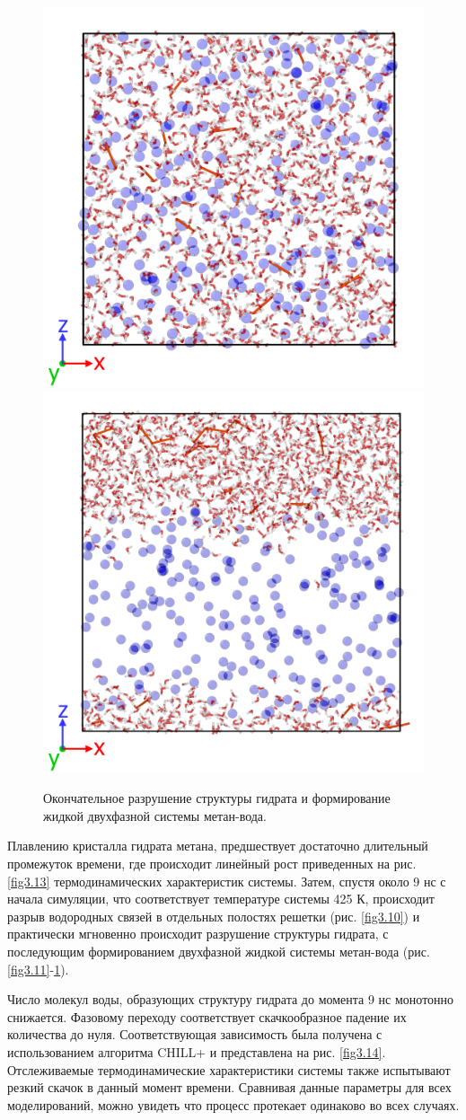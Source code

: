 \begin{figure}[H]
    \centering
    \begin{minipage}{\linewidth}
        \includegraphics[width=.5\linewidth]{figures/tip4p_melt7.png}\hfill
        \includegraphics[width=.5\linewidth]{figures/tip4p_melt8.png}
    \end{minipage}
    \caption{Окончательное разрушение структуры гидрата и формирование жидкой двухфазной системы метан-вода.}
    \label{fig3.12}
\end{figure}

Плавлению кристалла гидрата метана, предшествует достаточно длительный промежуток времени, где происходит линейный рост приведенных на рис. \ref{fig3.13} термодинамических характеристик системы. Затем, спустя около 9 нс с начала симуляции, что соответствует температуре системы 425 К, происходит разрыв водородных связей в отдельных полостях решетки (рис. \ref{fig3.10}) и практически мгновенно происходит разрушение структуры гидрата, с последующим формированием двухфазной жидкой системы метан-вода (рис. \ref{fig3.11}-\ref{fig3.12}). 

Число молекул воды, образующих структуру гидрата до момента 9 нс монотонно снижается. Фазовому переходу соответствует скачкообразное падение их количества до нуля. Соответствующая зависимость была получена с использованием алгоритма CHILL+ и представлена на рис. \ref{fig3.14}. Отслеживаемые термодинамические характеристики системы также испытывают резкий скачок в данный момент времени. Сравнивая данные параметры для всех моделирований, можно увидеть что процесс протекает одинаково во всех случаях.

